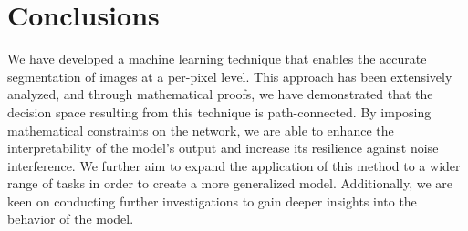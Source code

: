 \section{Conclusions}

We have developed a machine learning technique that enables the accurate
segmentation of images at a per-pixel level.
This approach has been extensively analyzed, and through mathematical proofs,
we have demonstrated that the decision space resulting from this technique
is path-connected. By imposing mathematical constraints on the network,
we are able to enhance the interpretability of the model's output and increase
its resilience against noise interference.
We further aim to expand the application of this method to a wider range of tasks
in order to create a more generalized model.
Additionally, we are keen on conducting further investigations to gain deeper
insights into the behavior of the model.